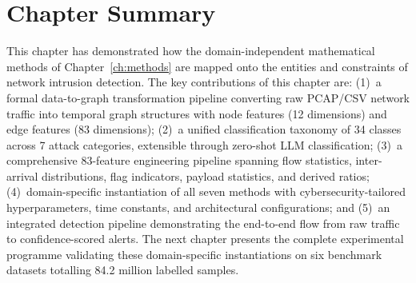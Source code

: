 \section{Chapter Summary}
\label{sec:ch3_summary}

This chapter has demonstrated how the domain-independent mathematical methods of Chapter~\ref{ch:methods} are mapped onto the entities and constraints of network intrusion detection. The key contributions of this chapter are: (1)~a formal data-to-graph transformation pipeline converting raw PCAP/CSV network traffic into temporal graph structures with node features (12 dimensions) and edge features (83 dimensions); (2)~a unified classification taxonomy of 34 classes across 7 attack categories, extensible through zero-shot LLM classification; (3)~a comprehensive 83-feature engineering pipeline spanning flow statistics, inter-arrival distributions, flag indicators, payload statistics, and derived ratios; (4)~domain-specific instantiation of all seven methods with cybersecurity-tailored hyperparameters, time constants, and architectural configurations; and (5)~an integrated detection pipeline demonstrating the end-to-end flow from raw traffic to confidence-scored alerts. The next chapter presents the complete experimental programme validating these domain-specific instantiations on six benchmark datasets totalling 84.2 million labelled samples.

